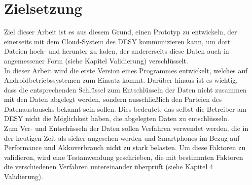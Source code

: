 \documentclass[10pt, a4paper,headsepline,pointednumbers]{scrreprt}
\begin{document}
\section{Zielsetzung}
Ziel dieser Arbeit ist es aus diesem Grund, einen Prototyp zu entwickeln, der einerseits mit dem Cloud-System des DESY kommunizieren kann, um dort Dateien hoch- und herunter zu laden, der andererseits diese Daten auch in angemessener Form (siehe Kapitel Validierung) verschlüsselt. \\
In dieser Arbeit wird die erste Version eines Programmes entwickelt, welches auf Androidbetriebssystemen zum Einsatz kommt. Darüber hinaus ist es wichtig, dass die entsprechenden Schlüssel zum Entschlüsseln der Daten nicht zusammen mit den Daten abgelegt werden, sondern ausschließlich den Parteien des Datenaustauschs bekannt sein sollen. Dies bedeutet, das selbst die Betreiber am DESY nicht die Möglichkeit haben, die abgelegten Daten zu entschlüsseln. \\
Zum Ver- und Entschüsseln der Daten sollen Verfahren verwendet werden, die in der heutigen Zeit als sicher angesehen werden und Smartphones im Bezug auf Performance und Akkuverbrauch nicht zu stark belasten. Um diese Faktoren zu validieren, wird eine Testanwendung geschrieben, die mit bestimmten Faktoren die verschiedenen Verfahren untereinander überprüft (siehe Kapitel 4 Validierung).



\end{document}

